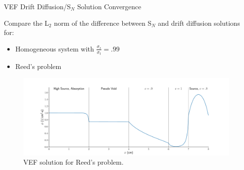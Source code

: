 \documentclass[10pt]{beamer}
\newcommand{\SN}{S$_N$\xspace}
\begin{document}
\begin{frame}{VEF Drift Diffusion/\SN Solution Convergence}

	Compare the L$_2$ norm of the difference between \SN and drift diffusion solutions for:
	\begin{itemize} 

		\item Homogeneous system with $\frac{\sigma_s}{\sigma_t} = .99$ 

		\item Reed's problem 

	\end{itemize}

	\begin{figure}
		\centering
		\includegraphics[width=\textwidth]{figs/reed_solution.pdf}
		\caption{VEF solution for Reed's problem. }
	\end{figure}

\end{frame}
\end{document}
